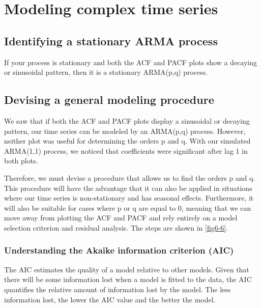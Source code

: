 \chapter{Modeling complex time series\label{ch06}}
\section{Identifying a stationary ARMA process}
\begin{tcolorbox}[title=Identifying a stationary ARMA process]
    If your process is stationary and both the ACF and PACF plots show a decaying or sinusoidal pattern, then it is a stationary ARMA(p,q) process.
\end{tcolorbox}
\section{Devising a general modeling procedure}
We saw that if both the ACF and PACF plots display a sinusoidal or decaying pattern, our time series can be modeled by an ARMA(p,q) process. However, neither plot was useful for determining the orders p and q. With our simulated ARMA(1,1) process, we noticed that coefficients were significant after lag 1 in both plots.

Therefore, we must devise a procedure that allows us to find the orders p and q. This procedure will have the advantage that it can also be applied in situations where our time series is non-stationary and has seasonal effects. Furthermore, it will also be suitable for cases where p or q are equal to 0, meaning that we can move away from plotting the ACF and PACF and rely entirely on a model selection criterion and residual analysis. The steps are shown in \autoref{fig6-6}.

\subsection{Understanding the Akaike information criterion (AIC)}
The AIC estimates the quality of a model relative to other models. Given that there will be some information lost when a model is fitted to the data, the AIC quantifies the relative amount of information lost by the model. The less information lost, the lower the AIC value and the better the model.

